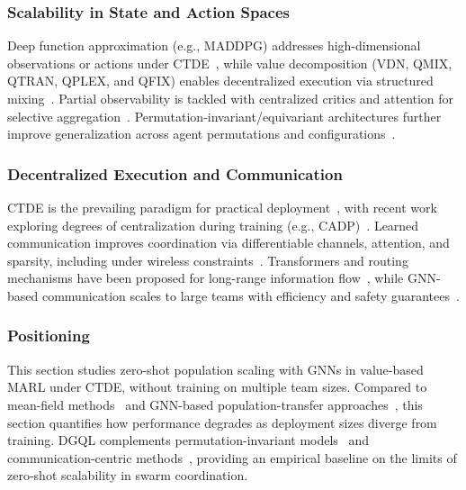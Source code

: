 \subsubsection{Scalability in State and Action Spaces}
Deep function approximation (e.g., MADDPG) addresses high-dimensional observations 
 or actions under CTDE~\cite{DBLP:conf/nips/LoweWTHAM17}, 
 while value decomposition (VDN, QMIX, QTRAN, QPLEX, and QFIX) 
 enables decentralized execution via structured 
 mixing~\cite{DBLP:conf/aaai/SunehagLGCZJLSL18,DBLP:conf/icml/RashidSWFFW18,DBLP:conf/icml/SonKKHY19,wang2021qplex,baisero2025fixing}. 
% 
Partial observability is tackled with centralized critics 
 and attention for selective aggregation~\cite{foerster2018counterfactual,DBLP:journals/corr/abs-1911-10635}. 
% 
Permutation-invariant/equivariant architectures further improve generalization across agent 
 permutations and configurations~\cite{peng2021permutation,hao2023boosting}.

\subsubsection{Decentralized Execution and Communication}
CTDE is the prevailing paradigm for practical deployment~\cite{amato2024introduction}, 
 with recent work exploring degrees of centralization during training 
 (e.g., CADP)~\cite{zhou2023centralized}. 
%
Learned communication improves coordination via differentiable 
 channels, attention, and sparsity, including under wireless 
 constraints~\cite{DBLP:conf/nips/SukhbaatarSF16,das2019tarmac,singh2019learning,hu2023learning}. 
%
Transformers and routing mechanisms have been proposed 
 for long-range information flow~\cite{zhang2024complementary,guo2023scalable}, 
 while \gls{GNN}-based communication scales to large teams with efficiency 
 and safety guarantees~\cite{liu2024graph,du2025scalable}.

\subsubsection{Positioning}
This section studies zero-shot population scaling with \glspl{GNN} in value-based \gls{MARL} under CTDE, 
 without training on multiple team sizes. 
%
Compared to mean-field methods~\cite{DBLP:conf/icml/YangLLZZWY18} 
 and GNN-based population-transfer approaches~\cite{nayak2023scalable}, 
 this section quantifies how performance degrades as deployment sizes diverge from training. 
%
DGQL complements permutation-invariant models~\cite{hao2023boosting,lin2024hgap} 
 and communication-centric methods~\cite{guo2023scalable,du2025scalable}, 
 providing an empirical baseline on the limits of zero-shot scalability in swarm coordination.

